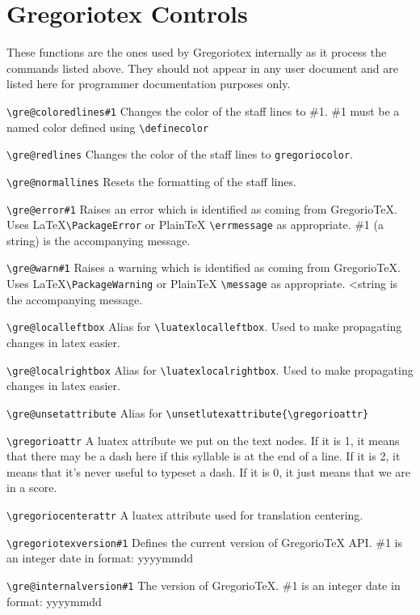 \section{Gregoriotex Controls}

These functions are the ones used by Gregoriotex internally as it process the commands listed above.  They should not appear in any user document and are listed here for programmer documentation purposes only.

\verb=\gre@coloredlines#1=%
	Changes the color of the staff lines to \#1.  \#1 must be a named color defined using \verb=\definecolor=

\verb=\gre@redlines=%
	Changes the color of the staff lines to \verb=gregoriocolor=.

\verb=\gre@normallines=%
	Resets the formatting of the staff lines.

\verb=\gre@error#1=%
	Raises an error which is identified as coming from GregorioTeX.  Uses \LaTeX \verb=\PackageError= or PlainTeX \verb=\errmessage= as appropriate.  \#1 (a string) is the accompanying message.
	
\verb=\gre@warn#1=%
	Raises a warning which is identified as coming from GregorioTeX.  Uses \LaTeX \verb=\PackageWarning= or PlainTeX \verb=\message= as appropriate.  <string is the accompanying message.
	
\verb=\gre@localleftbox=%
	Alias for \verb=\luatexlocalleftbox=.  Used to make propagating changes in latex easier.

\verb=\gre@localrightbox=%
	Alias for \verb=\luatexlocalrightbox=.  Used to make propagating changes in latex easier.
	
\verb=\gre@unsetattribute=%
	Alias for \verb=\unsetlutexattribute{\gregorioattr}=

\verb=\gregorioattr=%
	A luatex attribute we put on the text nodes.
	If it is 1, it means that there may be a dash here if this syllable is at the end of a line.
	If it is 2, it means that it's never useful to typeset a dash.
	If it is 0, it just means that we are in a score.

\verb=\gregoriocenterattr=%
	A luatex attribute used for translation centering.

\verb=\gregoriotexversion#1=%
	Defines the current version of GregorioTeX API.  \#1 is an integer date in format: yyyymmdd

\verb=\gre@internalversion#1=%
	The version of GregorioTeX.  \#1 is an integer date in format: yyyymmdd

